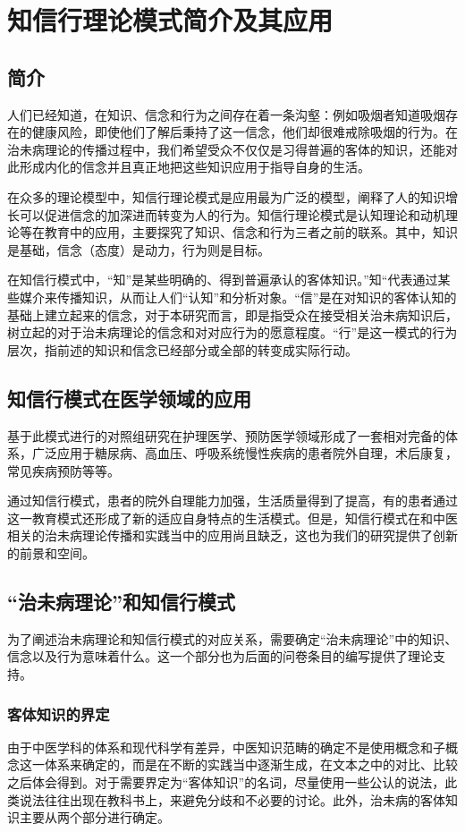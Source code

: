 \section{知信行理论模式简介及其应用}
\subsection{简介}
人们已经知道，在知识、信念和行为之间存在着一条沟壑：例如吸烟者知道吸烟存在的健康风险，即使他们了解后秉持了这一信念，他们却很难戒除吸烟的行为。在治未病理论的传播过程中，我们希望受众不仅仅是习得普遍的客体的知识，还能对此形成内化的信念并且真正地把这些知识应用于指导自身的生活。

在众多的理论模型中，知信行理论模式是应用最为广泛的模型，阐释了人的知识增长可以促进信念的加深进而转变为人的行为。知信行理论模式是认知理论和动机理论等在教育中的应用，主要探究了知识、信念和行为三者之前的联系。其中，知识是基础，信念（态度）是动力，行为则是目标。\cite{黄敬亨2006健康教育学}

在知信行模式中，“知”是某些明确的、得到普遍承认的客体知识。”知“代表通过某些媒介来传播知识，从而让人们“认知”和分析对象。“信”是在对知识的客体认知的基础上建立起来的信念，对于本研究而言，即是指受众在接受相关治未病知识后，树立起的对于治未病理论的信念和对对应行为的愿意程度。“行”是这一模式的行为层次，指前述的知识和信念已经部分或全部的转变成实际行动。\cite{金新政2003}

\subsection{知信行模式在医学领域的应用}基于此模式进行的对照组研究在护理医学、预防医学领域形成了一套相对完备的体系，广泛应用于糖尿病、高血压、呼吸系统慢性疾病的患者院外自理，术后康复，常见疾病预防等等。

通过知信行模式，患者的院外自理能力加强，生活质量得到了提高，有的患者通过这一教育模式还形成了新的适应自身特点的生活模式。但是，知信行模式在和中医相关的治未病理论传播和实践当中的应用尚且缺乏，这也为我们的研究提供了创新的前景和空间。

\subsection{“治未病理论”和知信行模式}
为了阐述治未病理论和知信行模式的对应关系，需要确定“治未病理论”中的知识、信念以及行为意味着什么。这一个部分也为后面的问卷条目的编写提供了理论支持。
\subsubsection{客体知识的界定}
由于中医学科的体系和现代科学有差异，中医知识范畴的确定不是使用概念和子概念这一体系来确定的，而是在不断的实践当中逐渐生成，在文本之中的对比、比较之后体会得到。对于需要界定为“客体知识”的名词，尽量使用一些公认的说法，此类说法往往出现在教科书上，来避免分歧和不必要的讨论。此外，治未病的客体知识主要从两个部分进行确定。

